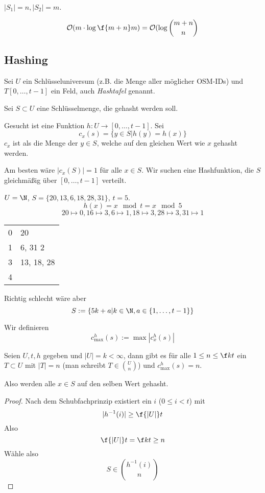 \documentclass[11pt]{scrartcl}
\renewcommand{\O}{\mathcal{O}}
\begin{document}


\begin{note}[Nachtrag]
	$|S_1| = n, |S_2| = m$.

	\[
		\O(m\cdot \log \f{m+n}m) = \O (\log \binom{m+n}{n}
	\]
\end{note}


\subsection{Hashing}

Sei $U$ ein Schlüsseluniversum (z.B. die Menge aller möglicher OSM-IDs) und $T[0,\dotsc, t-1]$ ein Feld, auch \emph{Hashtafel} genannt.

Sei $S\subset U$ eine Schlüsselmenge, die gehasht werden soll.

Gesucht ist eine Funktion $h: U \to [0,\dotsc, t-1]$.
Sei 
\[
	c_x(s) = \{y\in S | h(y) = h(x)\}
\]
$c_x$ ist als die Menge der $y\in S$, welche auf den gleichen Wert wie $x$ gehasht werden.

Am besten wäre $|c_x(S)| = 1$ für alle $x\in S$.
Wir suchen eine Hashfunktion, die $S$ gleichmäßig über $[0,\dotsc, t-1]$ verteilt.

\begin{ex}
	$U = \N$, $S = \{20,13,6,18,28,31\}$, $t=5$.
	\[
		h(x) = x \mod t = x \mod 5
	\]
	\[
		20\mapsto 0, 16 \mapsto 3, 6 \mapsto 1, 18 \mapsto 3, 28 \mapsto 3, 31 \mapsto 1
	\]
	\begin{tabular}{r|l}
		0 & 20 \\
		1 & 6, 31
		2   \\
		3 & 13, 18, 28 \\
		4  \\
	\end{tabular}
	Richtig schlecht wäre aber
	\[
		S := \{5k + a | k\in \N, a\in \{1,\dotsc, t-1\}\}
	\]
\end{ex}


\begin{df}
	Wir definieren 
	\[
		c_{\max}^h(s) := \max |c_x^h (s)|
	\]
\end{df}


\begin{st}
	Seien $U, t, h$ gegeben und $|U| = k < \infty$, dann gibt es für alle $1\le n\le \f kt$ ein $T\subset U$ mit $|T|=n$ (man schreibt $T\in \binom{U}{n}$) und $c_{\max}^h(s) =n$.

	Also werden alle $x\in S$ auf den selben Wert gehasht.
	\begin{proof}
		Nach dem Schubfachprinzip existiert ein $i$ ($0\le i<t$) mit 
		\[
			|h^{-1}(i)| \ge \f{|U|}t
		\]
		Also
		\[
			\f {|U|}t = \f kt \ge n
		\]
		Wähle also
		\[
		S \in \binom{ h^{-1}(i)}{n}
		\]
	\end{proof}
\end{st}
\end{document}
